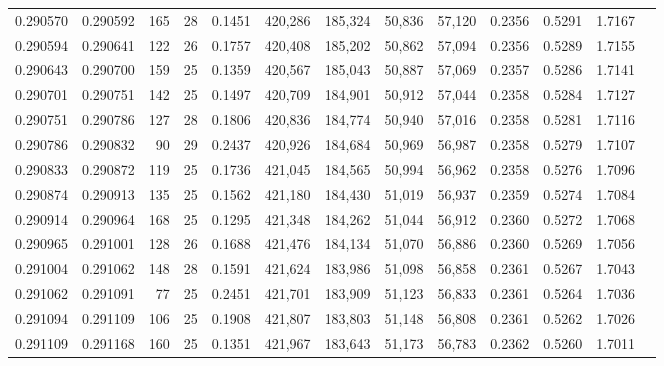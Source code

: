 \begin{tabular}{rrrrrrrrrrrrr}
0.290570 & 0.290592 &   165 &  28 &                                     0.1451 & 420,286 & 185,324 &  50,836 &  57,120 & 0.2356 & 0.5291 & 1.7167 \\
0.290594 & 0.290641 &   122 &  26 &                                     0.1757 & 420,408 & 185,202 &  50,862 &  57,094 & 0.2356 & 0.5289 & 1.7155 \\
0.290643 & 0.290700 &   159 &  25 &                                     0.1359 & 420,567 & 185,043 &  50,887 &  57,069 & 0.2357 & 0.5286 & 1.7141 \\
0.290701 & 0.290751 &   142 &  25 &                                     0.1497 & 420,709 & 184,901 &  50,912 &  57,044 & 0.2358 & 0.5284 & 1.7127 \\
0.290751 & 0.290786 &   127 &  28 &                                     0.1806 & 420,836 & 184,774 &  50,940 &  57,016 & 0.2358 & 0.5281 & 1.7116 \\
0.290786 & 0.290832 &    90 &  29 &                                     0.2437 & 420,926 & 184,684 &  50,969 &  56,987 & 0.2358 & 0.5279 & 1.7107 \\
0.290833 & 0.290872 &   119 &  25 &                                     0.1736 & 421,045 & 184,565 &  50,994 &  56,962 & 0.2358 & 0.5276 & 1.7096 \\
0.290874 & 0.290913 &   135 &  25 &                                     0.1562 & 421,180 & 184,430 &  51,019 &  56,937 & 0.2359 & 0.5274 & 1.7084 \\
0.290914 & 0.290964 &   168 &  25 &                                     0.1295 & 421,348 & 184,262 &  51,044 &  56,912 & 0.2360 & 0.5272 & 1.7068 \\
0.290965 & 0.291001 &   128 &  26 &                                     0.1688 & 421,476 & 184,134 &  51,070 &  56,886 & 0.2360 & 0.5269 & 1.7056 \\
0.291004 & 0.291062 &   148 &  28 &                                     0.1591 & 421,624 & 183,986 &  51,098 &  56,858 & 0.2361 & 0.5267 & 1.7043 \\
0.291062 & 0.291091 &    77 &  25 &                                     0.2451 & 421,701 & 183,909 &  51,123 &  56,833 & 0.2361 & 0.5264 & 1.7036 \\
0.291094 & 0.291109 &   106 &  25 &                                     0.1908 & 421,807 & 183,803 &  51,148 &  56,808 & 0.2361 & 0.5262 & 1.7026 \\
0.291109 & 0.291168 &   160 &  25 &                                     0.1351 & 421,967 & 183,643 &  51,173 &  56,783 & 0.2362 & 0.5260 & 1.7011 \\

\end{tabular}
